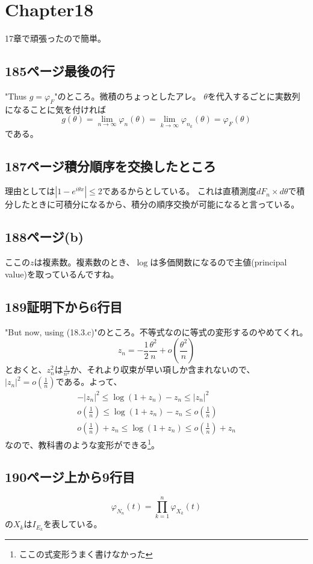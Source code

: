 \section{Chapter18}
  17章で頑張ったので簡単。
  \subsection{185ページ最後の行}
    "Thus $g = \varphi_F$"のところ。微積のちょっとしたアレ。
    $\theta$を代入するごとに実数列になることに気を付ければ
    \[
      g(\theta) = \lim_{n \to \infty}\varphi_n(\theta) = \lim_{k \to \infty}\varphi_{n_k}(\theta) = \varphi_F(\theta)
    \]
    である。
  \subsection{187ページ積分順序を交換したところ}
    理由としては$|1 - e^{i\theta x}| \leq 2$であるからとしている。
    これは直積測度$dF_n \times d\theta$で積分したときに可積分になるから、積分の順序交換が可能になると言っている。
  \subsection{188ページ(b)}
    ここの$z$は複素数。複素数のとき、$\log$は多価関数になるので主値(principal value)を取っているんですね。
  \subsection{189証明下から6行目}
    "But now, using (18.3.c)"のところ。不等式なのに等式の変形するのやめてくれ。
    \[
      z_n = -\frac{1}{2}\frac{\theta^2}{n} + o\left(\frac{\theta^2}{n}\right)
    \]
    とおくと、$z_n^2$は$\frac{1}{n^2}$か、それより収束が早い項しか含まれないので、
    $|z_n|^2 = o(\frac{1}{n})$である。よって、
    \begin{align*}
      -|z_n|^2 \leq \log(1 + z_n) - z_n \leq |z_n|^2\\
      o\left( \frac{1}{n} \right) \leq \log(1 + z_n) - z_n \leq o\left( \frac{1}{n} \right)\\
      o\left( \frac{1}{n} \right) + z_n \leq \log(1 + z_n) \leq o\left( \frac{1}{n} \right) + z_n
    \end{align*}
    なので、教科書のような変形ができる\footnote{ここの式変形うまく書けなかった}。
  \subsection{190ページ上から9行目}
    \[
      \varphi_{N_n}(t) = \prod_{k = 1}^n \varphi_{X_k}(t)
    \]
    の$X_k$は$I_{E_k}$を表している。

